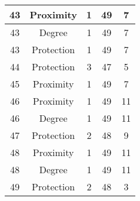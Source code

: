 \documentclass[results.tex]{subfiles}
\begin{document}
\begin{center}
\begin{tabular}{| c || c | c | c | c |}
            \hline
            43                      & Proximity                    & 1                      & 49                      & 7                    \\
            \hline
            43                      & Degree                       & 1                      & 49                      & 7                    \\
            \hline
            43                      & Protection                   & 1                      & 49                      & 7                    \\
            \hline
            44                      & Protection                   & 3                      & 47                      & 5                    \\
            \hline
            45                      & Proximity                    & 1                      & 49                      & 7                    \\
            \hline
            46                      & Proximity                    & 1                      & 49                      & 11                   \\
            \hline
            46                      & Degree                       & 1                      & 49                      & 11                   \\
            \hline
            47                      & Protection                   & 2                      & 48                      & 9                    \\
            \hline
            48                      & Proximity                    & 1                      & 49                      & 11                   \\
            \hline
            48                      & Degree                       & 1                      & 49                      & 11                   \\
            \hline
            49                      & Protection                   & 2                      & 48                      & 3                    \\
            \hline
        \end{tabular}
    \end{center}
\end{document}
